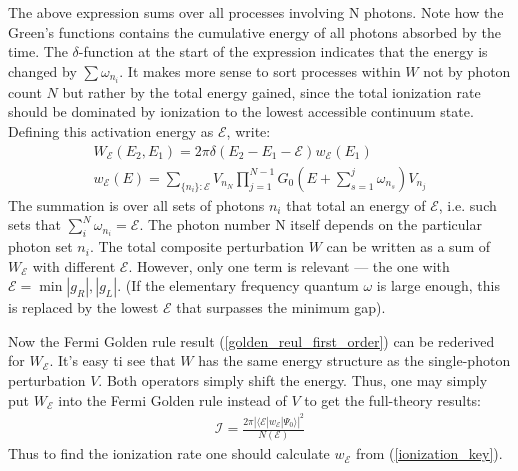 The above expression sums over all processes involving N photons. Note how the Green's functions contains the cumulative energy of all photons absorbed by the time. The $ \delta $-function at the start of the expression indicates that the energy is changed by $ \sum\omega_{n_{i}} $. It makes more sense to sort processes within $ W $ not by photon count $ N $ but rather by the total energy gained, since the total ionization rate should be dominated by ionization to the lowest accessible continuum state. Defining this activation energy as $ \mathcal{E} $, write:
\begin{gather}
W_{\mathcal{E}}(E_{2},E_{1})=2\pi\delta(E_{2}-E_{1}-\mathcal{E})w_{\mathcal{E}}(E_{1})\\
\label{ionization_key_app}
w_{\mathcal{E}}(E)
=
\sum_{\{n_{i}\}:\mathcal{E}}V_{n_{N}}\prod_{j=1}^{N-1}G_{0}\left(E+\sum_{s=1}^{j}\omega_{n_{s}}\right)V_{n_{j}}
\end{gather}
The summation is over all sets of photons $ {n_{i}} $ that total an energy of $ \mathcal{E} $, i.e. such sets that $ \sum_{i}^{N}\omega_{n_{i}}=\mathcal{E} $. The photon number N itself depends on the particular photon set $ n_{i} $. The total composite perturbation $ W $ can be written as a sum of $ W_{\mathcal{E}} $ with different $ \mathcal{E} $. However, only one term is relevant --- the one with $ \mathcal{E}=\min{|g_{R}|,|g_{L}| }$. (If the elementary frequency quantum $ \omega $ is large enough, this is replaced by the lowest $ \mathcal{E} $ that surpasses the minimum gap). 

Now  the Fermi Golden rule result (\ref{golden_reul_first_order}) can be rederived 	for $ W_{\mathcal{E}} $. It's easy ti see that $ W $ has the same energy structure as the single-photon perturbation $ V $. Both operators simply shift the energy. Thus, one may simply put $ W_{\mathcal{E}} $ into the Fermi Golden rule instead of $ V $ to get the full-theory results:
\begin{gather}
	\mathcal{I}=\frac{2\pi|\langle\mathcal{E}|w_{\mathcal{E}}|\Psi_{0}\rangle|^{2}}{N(\mathcal{E})}
\end{gather}
Thus to find the ionization rate one should calculate $ w_{\mathcal{E}} $ from (\ref{ionization_key}).